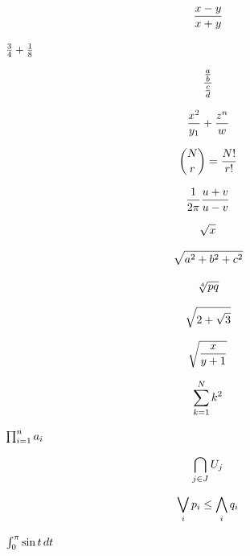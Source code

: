 \documentclass{article}
\newcommand*\pdfcraftbegin[1]{\special{pdfcraft:eq:#1:begin}}
\newcommand*\pdfcraftend[1]{\special{pdfcraft:eq:#1:end}}
\begin{document}
\setcounter{equation}{0}
\[\pdfcraftbegin{ho_frac_basic}
\frac{x-y}{x+y}
\pdfcraftend{ho_frac_basic}\]
\par
\newpage
\setcounter{equation}{0}
$\pdfcraftbegin{ho_frac_inline}
\frac{3}{4} + \frac{1}{8}
\pdfcraftend{ho_frac_inline}$
\par
\newpage
\setcounter{equation}{0}
\[\pdfcraftbegin{ho_frac_nested2}
\frac{\frac{a}{b}}{\frac{c}{d}}
\pdfcraftend{ho_frac_nested2}\]
\par
\newpage
\setcounter{equation}{0}
\[\pdfcraftbegin{ho_frac_scripts}
\frac{x^2}{y_1} + \frac{z^{n}}{w}
\pdfcraftend{ho_frac_scripts}\]
\par
\newpage
\setcounter{equation}{0}
\[\pdfcraftbegin{ho_binom_big}
\binom{N}{r} = \frac{N!}{r!}
\pdfcraftend{ho_binom_big}\]
\par
\newpage
\setcounter{equation}{0}
\[\pdfcraftbegin{ho_frac_pair}
\frac{1}{2\pi}\frac{u+v}{u-v}
\pdfcraftend{ho_frac_pair}\]
\par
\newpage
\setcounter{equation}{0}
\[\pdfcraftbegin{ho_sqrt_x}
\sqrt{x}
\pdfcraftend{ho_sqrt_x}\]
\par
\newpage
\setcounter{equation}{0}
\[\pdfcraftbegin{ho_sqrt_sum}
\sqrt{a^2 + b^2 + c^2}
\pdfcraftend{ho_sqrt_sum}\]
\par
\newpage
\setcounter{equation}{0}
\[\pdfcraftbegin{ho_sqrt_root4}
\sqrt[4]{p q}
\pdfcraftend{ho_sqrt_root4}\]
\par
\newpage
\setcounter{equation}{0}
\[\pdfcraftbegin{ho_sqrt_nested}
\sqrt{2 + \sqrt{3}}
\pdfcraftend{ho_sqrt_nested}\]
\par
\newpage
\setcounter{equation}{0}
\[\pdfcraftbegin{ho_sqrt_frac}
\sqrt{\frac{x}{y+1}}
\pdfcraftend{ho_sqrt_frac}\]
\par
\newpage
\setcounter{equation}{0}
\[\pdfcraftbegin{ho_sum_limits}
\sum_{k=1}^{N} k^2
\pdfcraftend{ho_sum_limits}\]
\par
\newpage
\setcounter{equation}{0}
$\pdfcraftbegin{ho_prod_inline}
\prod_{i=1}^{n} a_i
\pdfcraftend{ho_prod_inline}$
\par
\newpage
\setcounter{equation}{0}
\[\pdfcraftbegin{ho_bigcap}
\bigcap_{j \in J} U_j
\pdfcraftend{ho_bigcap}\]
\par
\newpage
\setcounter{equation}{0}
\[\pdfcraftbegin{ho_bigvee}
\bigvee_{i} p_i \le \bigwedge_{i} q_i
\pdfcraftend{ho_bigvee}\]
\par
\newpage
\setcounter{equation}{0}
$\pdfcraftbegin{ho_int_basic}
\int_0^\pi \sin t\,dt
\pdfcraftend{ho_int_basic}$
\par
\newpage
\end{document}
